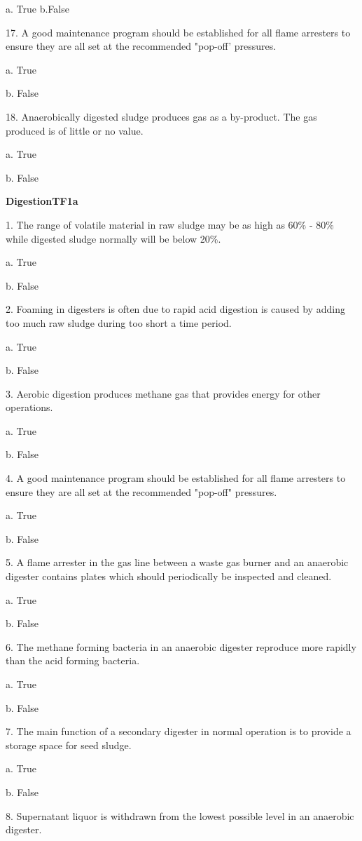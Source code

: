 \documentclass{article}
\begin{document}
a. True
b.False 


17. A good maintenance program should be established for all flame arresters to ensure they are all set at the recommended "pop-off' pressures. 

a. True 

b. False 


18. Anaerobically digested sludge produces gas as a by-product. The gas produced is of little or no value. 

a. True 

b. False 

\textbf{DigestionTF1a}

1. The range of volatile material in raw sludge may be as high as 60\% - 80\% while digested sludge normally will be below 20\%. 

a. True 

b. False 


2. Foaming in digesters is often due to rapid acid digestion is caused by adding too much raw sludge during too short a time period. 

a. True 

b. False 


3. Aerobic digestion produces methane gas that provides energy for other operations. 

a. True 

b. False 


4. A good maintenance program should be established for all flame arresters to ensure they are all set at the recommended "pop-off" pressures. 

a. True 

b. False 


5. A flame arrester in the gas line between a waste gas burner and an anaerobic digester contains plates which should periodically be inspected and cleaned. 

a. True 

b. False 


6. The methane forming bacteria in an anaerobic digester reproduce more rapidly than the acid forming bacteria. 

a. True 

b. False 


7. The main function of a secondary digester in normal operation is to provide a storage space for seed sludge. 

a. True 

b. False 


8. Supernatant liquor is withdrawn from the lowest possible level in an anaerobic digester. 
\end{document}
